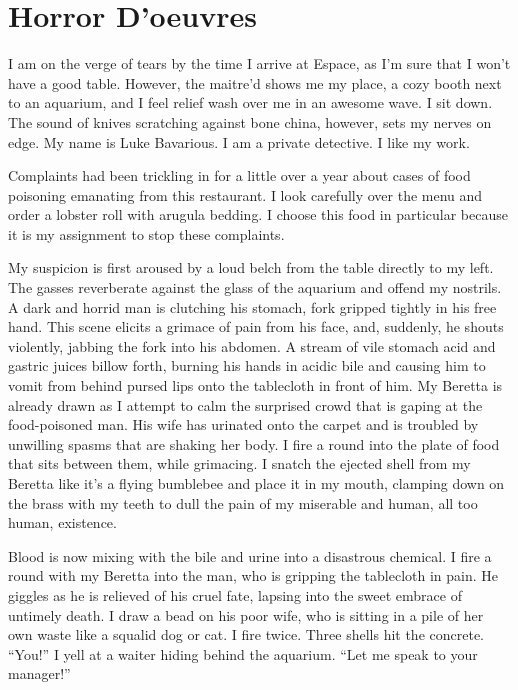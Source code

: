 \chapter{Horror D'oeuvres}


I am on the verge of tears by the time I arrive at Espace, as
I'm sure that I won't have a good table. However, the
maitre'd shows me my place, a cozy booth next to an aquarium,
and I feel relief wash over me in an awesome wave. I sit down. The
sound of knives scratching against bone china, however, sets my
nerves on edge. My name is Luke Bavarious. I am a private
detective. I like my work.



Complaints had been trickling in for a little over a year about
cases of food poisoning emanating from this restaurant. I look
carefully over the menu and order a lobster roll with arugula
bedding. I choose this food in particular because it is my
assignment to stop these complaints.



My suspicion is first aroused by a loud belch from the table
directly to my left. The gasses reverberate against the glass of
the aquarium and offend my nostrils. A dark and horrid man is
clutching his stomach, fork gripped tightly in his free hand. This
scene elicits a grimace of pain from his face, and, suddenly, he
shouts violently, jabbing the fork into his abdomen. A stream of
vile stomach acid and gastric juices billow forth, burning his
hands in acidic bile and causing him to vomit from behind pursed
lips onto the tablecloth in front of him. My Beretta is already
drawn as I attempt to calm the surprised crowd that is gaping at
the food-poisoned man. His wife has urinated onto the carpet and is
troubled by unwilling spasms that are shaking her body. I fire a
round into the plate of food that sits between them, while
grimacing. I snatch the ejected shell from my Beretta like
it's a flying bumblebee and place it in my mouth, clamping
down on the brass with my teeth to dull the pain of my miserable
and human, all too human, existence.



Blood is now mixing with the bile and urine into a disastrous
chemical. I fire a round with my Beretta into the man, who is
gripping the tablecloth in pain. He giggles as he is relieved of
his cruel fate, lapsing into the sweet embrace of untimely death. I
draw a bead on his poor wife, who is sitting in a pile of her own
waste like a squalid dog or cat. I fire twice. Three shells hit the
concrete. ``You!'' I yell at a waiter hiding behind the
aquarium. ``Let me speak to your manager!''



